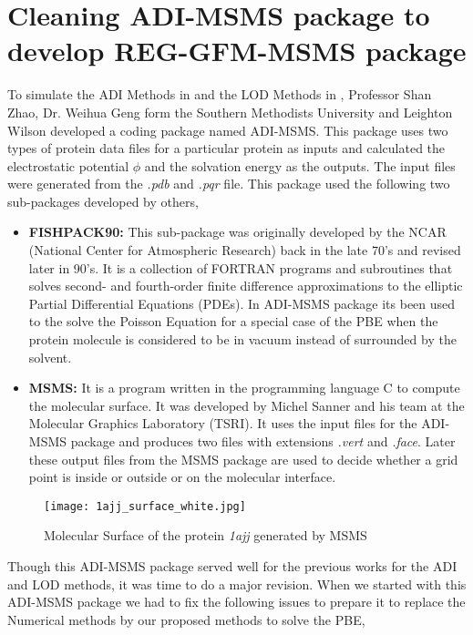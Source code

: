 

\section{Cleaning ADI-MSMS package to develop REG-GFM-MSMS package}	
To simulate the ADI Methods in \cite{geng_fully_2013} and the LOD Methods in \cite{Wilson2016}, Professor Shan Zhao, Dr. Weihua Geng form the Southern Methodists University and Leighton Wilson developed a coding package named ADI-MSMS. This package uses two types of protein data files for a particular protein as inputs and calculated the electrostatic potential $\phi$ and the solvation energy as the outputs. The input files were generated from the {\it .pdb} and {\it .pqr } file. This package used the following two sub-packages developed by others,

\begin{itemize}
	\item {\bf FISHPACK90:} This sub-package was originally developed by the NCAR (National Center for Atmospheric Research) back in the late 70's and revised later in 90's. It is a collection of FORTRAN programs and subroutines that solves second- and fourth-order finite difference approximations to  the elliptic Partial Differential Equations (PDEs). In ADI-MSMS package its been used to the solve the Poisson Equation for a special case of the PBE when the protein molecule is considered to be in vacuum instead of surrounded by the solvent.
	\item {\bf MSMS:} It is a program \cite{MSMS} written in the programming language C to compute the molecular surface. It was developed by  Michel Sanner and his team  at the Molecular Graphics Laboratory (TSRI). It uses the input files for the ADI-MSMS package and produces two files with extensions {\it .vert} and {\it .face}. Later these output files from the MSMS package are used to decide whether a grid point is inside or outside or on the molecular interface. 
\end{itemize} 



\begin{figure}[!ht]
	\centering
	\texttt{[image: 1ajj\_surface\_white.jpg]}	
	\caption{Molecular Surface of the protein \textit{1ajj} generated by MSMS}
\end{figure}

Though this ADI-MSMS package served well for the previous works for the ADI and LOD methods, it was time to do a major revision. When we started with this ADI-MSMS package we had to fix the following issues to prepare it to replace the Numerical methods by our proposed methods to solve the PBE,

